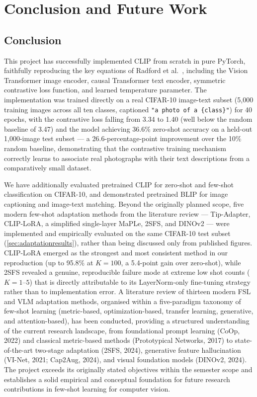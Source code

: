 \documentclass{iutbscthesis}
\begin{document}
\chapter{Conclusion and Future Work}

\section{Conclusion}

This project has successfully implemented CLIP from scratch in pure PyTorch, faithfully reproducing the key equations of Radford et al.\ \cite{radford2021clip}, including the Vision Transformer image encoder, causal Transformer text encoder, symmetric contrastive loss function, and learned temperature parameter. The implementation was trained directly on a real CIFAR-10 image-text subset (5{,}000 training images across all ten classes, captioned \texttt{"a photo of a \{class\}"}) for 40 epochs, with the contrastive loss falling from 3.34 to 1.40 (well below the random baseline of 3.47) and the model achieving 36.6\% zero-shot accuracy on a held-out 1{,}000-image test subset --- a 26.6-percentage-point improvement over the 10\% random baseline, demonstrating that the contrastive training mechanism correctly learns to associate real photographs with their text descriptions from a comparatively small dataset.

We have additionally evaluated pretrained CLIP for zero-shot and few-shot classification on CIFAR-10, and demonstrated pretrained BLIP for image captioning and image-text matching. Beyond the originally planned scope, five modern few-shot adaptation methods from the literature review --- Tip-Adapter, CLIP-LoRA, a simplified single-layer MaPLe, 2SFS, and DINOv2 --- were implemented and empirically evaluated on the same CIFAR-10 test subset (\autoref{sec:adaptationresults}), rather than being discussed only from published figures. CLIP-LoRA emerged as the strongest and most consistent method in our reproduction (up to 95.8\% at $K=100$, a 5.4-point gain over zero-shot), while 2SFS revealed a genuine, reproducible failure mode at extreme low shot counts ($K=1$--$5$) that is directly attributable to its LayerNorm-only fine-tuning strategy rather than to implementation error. A literature review of thirteen modern FSL and VLM adaptation methods, organised within a five-paradigm taxonomy of few-shot learning (metric-based, optimization-based, transfer learning, generative, and attention-based), has been conducted, providing a structured understanding of the current research landscape, from foundational prompt learning (CoOp, 2022) and classical metric-based methods (Prototypical Networks, 2017) to state-of-the-art two-stage adaptation (2SFS, 2024), generative feature hallucination (VI-Net, 2021; Cap2Aug, 2024), and visual foundation models (DINOv2, 2024). The project exceeds its originally stated objectives within the semester scope and establishes a solid empirical and conceptual foundation for future research contributions in few-shot learning for computer vision.
\end{document}
